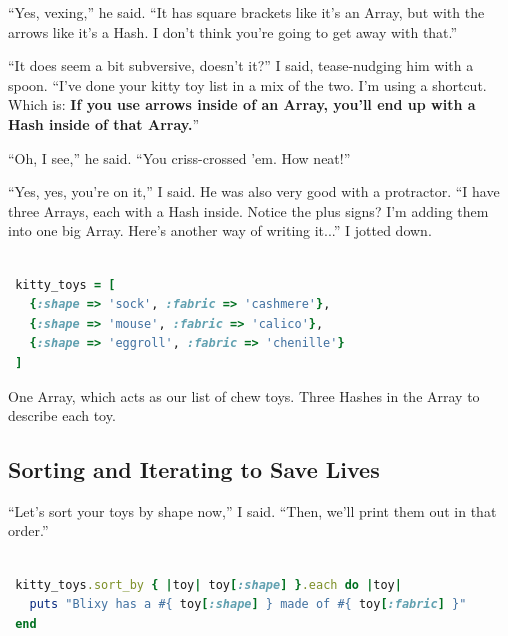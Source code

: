 \documentclass[10pt,twoside]{report}
\begin{document}
``Yes, vexing,'' he said.  ``It has square brackets like it's an
Array, but with the arrows like it's a Hash. I don't think you're
going to get away with that.''

``It does seem a bit subversive, doesn't it?''  I said, tease-nudging
him with a spoon.  ``I've done your kitty toy list in a mix of the
two.  I'm using a shortcut.  Which is: {\bf If you use arrows inside
  of an Array, you'll end up with a Hash inside of that Array.}''

``Oh, I see,'' he said.  ``You criss-crossed 'em.  How neat!''

``Yes, yes, you're on it,'' I said.  He was also very good with a
protractor.  ``I have three Arrays, each with a Hash inside.  Notice
the plus signs?  I'm adding them into one big Array.  Here's another
way of writing it...''  I jotted down.


\begin{lstlisting}[basicstyle=\ttfamily\color{basiccolor},
    commentstyle = \ttfamily\color{commentcolor},
    keywordstyle=\ttfamily\color{keywordscolor},
    stringstyle=\color{stringcolor},
    language=Ruby,
    basicstyle=\small\ttfamily,
    showstringspaces=false,
  ]

 kitty_toys = [
   {:shape => 'sock', :fabric => 'cashmere'},
   {:shape => 'mouse', :fabric => 'calico'},
   {:shape => 'eggroll', :fabric => 'chenille'}
 ]

\end{lstlisting}


One Array, which acts as our list of chew toys.  Three Hashes in the
Array to describe each toy.



\subsection{Sorting and Iterating to Save Lives}



``Let's sort your toys by shape now,'' I said.  ``Then, we'll print
them out in that order.''


\begin{lstlisting}[basicstyle=\ttfamily\color{basiccolor},
    commentstyle = \ttfamily\color{commentcolor},
    keywordstyle=\ttfamily\color{keywordscolor},
    stringstyle=\color{stringcolor},
    language=Ruby,
    basicstyle=\small\ttfamily,
    showstringspaces=false,
  ]

 kitty_toys.sort_by { |toy| toy[:shape] }.each do |toy| 
   puts "Blixy has a #{ toy[:shape] } made of #{ toy[:fabric] }"
 end

\end{lstlisting}
\end{document}
